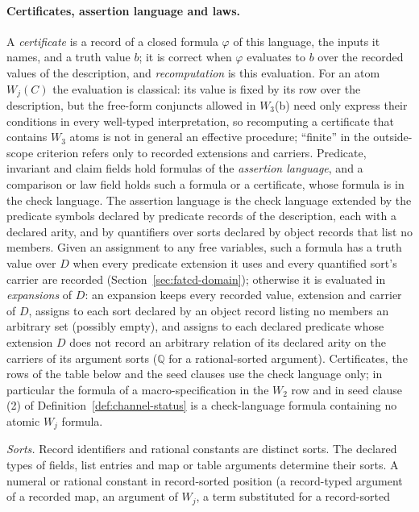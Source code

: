 \paragraph{Certificates, assertion language and laws.} A \emph{certificate} is a record of a closed formula \(\varphi\) of
this language, the inputs it names, and a truth value \(b\); it is correct
when \(\varphi\) evaluates to \(b\) over the recorded values of the
description, and \emph{recomputation} is this evaluation. For an atom \(W_j(C)\) the evaluation is classical: its value is fixed by its row over the description, but the free-form conjuncts allowed in \(W_3\)(b) need only express their conditions in every well-typed interpretation, so recomputing a certificate that contains \(W_3\) atoms is not in general an effective procedure; ``finite'' in the outside-scope criterion refers only to recorded extensions and carriers. Predicate,
invariant and claim fields hold formulas of the \emph{assertion language}, and
a comparison or law field holds such a formula or a certificate, whose formula
is in the check language. The assertion language is the check language extended by the predicate
symbols declared by predicate records of the description, each with a declared
arity, and by quantifiers over sorts declared by object records that list no
members. Given an assignment to any free variables, such a formula has a truth value over \(D\) when every predicate extension it
uses and every quantified sort's carrier are recorded
(Section~\ref{sec:fatcd-domain}); otherwise it is evaluated in \emph{expansions} of \(D\): an expansion keeps every recorded value, extension and carrier of \(D\), assigns to each sort declared by an object record listing no members an arbitrary set (possibly empty), and assigns to each declared predicate whose extension \(D\) does not record an arbitrary relation of its declared arity on the carriers of its argument sorts (\(\mathbb Q\) for a rational-sorted argument). Certificates,
the rows of the table below and the seed clauses use the check language only;
in particular the formula of a macro-specification in the \(W_2\) row and in
seed clause (2) of Definition~\ref{def:channel-status} is a check-language formula containing no atomic \(W_j\)
formula.
\par\emph{Sorts.} Record identifiers and rational constants are distinct sorts. The declared
types of fields, list entries and map or table arguments determine their
sorts. A numeral or rational constant in record-sorted position (a record-typed argument of a
recorded map, an argument of \(W_j\), a term substituted for a record-sorted
